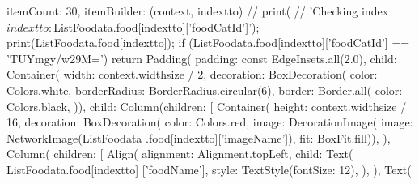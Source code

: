                                     itemCount: 30,
                                    itemBuilder: (context, indextto) {
                                      // print(
                                      //     'Checking index $indextto: ${ListFoodata.food[indextto]['foodCatId']}');
                                      print(ListFoodata.food[indextto]);
                                      if (ListFoodata.food[indextto]['foodCatId'] ==
                                          'TUYmgy/w29M=') {
                                        return Padding(
                                          padding: const EdgeInsets.all(2.0),
                                          child: Container(
                                            width: context.widthsize / 2,
                                            decoration: BoxDecoration(
                                                color: Colors.white,
                                                borderRadius: BorderRadius.circular(6),
                                                border: Border.all(
                                                  color: Colors.black,
                                                )),
                                            child: Column(children: [
                                              Container(
                                                height: context.widthsize / 16,
                                                decoration: BoxDecoration(
                                                    color: Colors.red,
                                                    image: DecorationImage(
                                                        image: NetworkImage(ListFoodata
                                                            .food[indextto]['imageName']),
                                                        fit: BoxFit.fill)),
                                              ),
                                              Column(
                                                children: [
                                                  Align(
                                                    alignment: Alignment.topLeft,
                                                    child: Text(
                                                      ListFoodata.food[indextto]
                                                          ['foodName'],
                                                      style: TextStyle(fontSize: 12),
                                                    ),
                                                  ),
                                                  Text(
}}
